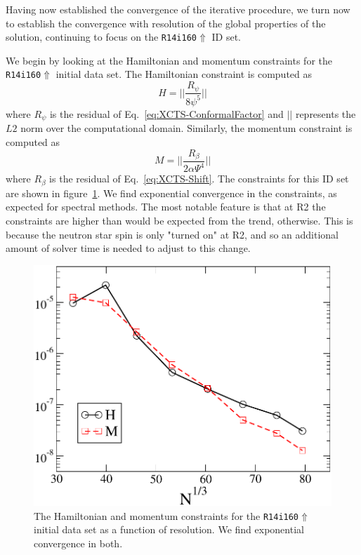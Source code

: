 Having now established the convergence of the iterative procedure, we
turn now to establish the convergence with resolution of the global
properties of the solution, continuing to focus on the {\tt R14i160$\Uparrow$} ID set.

We begin by looking at the Hamiltonian and momentum constraints for the {\tt R14i160$\Uparrow$} initial data set.
The Hamiltonian constraint is computed as
\begin{equation}
H=||\frac{R_{\psi}}{8\psi^5}||
\end{equation}
where $R_{\psi}$ is the residual of Eq.~\ref{eq:XCTS-ConformalFactor}
and $||$ represents the $L2$ norm over the computational
domain. Similarly, the momentum constraint is computed as
\begin{equation}
M = ||\frac{R_{\beta}}{2\alpha\Psi^4}||
\end{equation}
where $R_{\beta}$ is the residual of Eq.~\ref{eq:XCTS-Shift}.
The constraints for this ID set are shown in figure~\ref{fig:HamMom}. We find exponential convergence in the constraints, as expected for spectral methods. The most notable feature
is that at {\rm R2} the constraints are higher than would be expected from the trend, otherwise. This is because the neutron star spin is only "turned on" at {\rm R2}, and so an additional amount of
solver time is needed to adjust to this change.
\begin{figure}\includegraphics[width=0.95\columnwidth]{chap4/HamMom}
\caption[Hamiltonian and momentum constraints of the {\tt R14i160$\Uparrow$} ID set]{\label{fig:HamMom} The Hamiltonian and momentum constraints for the {\tt R14i160$\Uparrow$} initial data set
as a function of resolution. We find exponential convergence in both.}
\end{figure}

